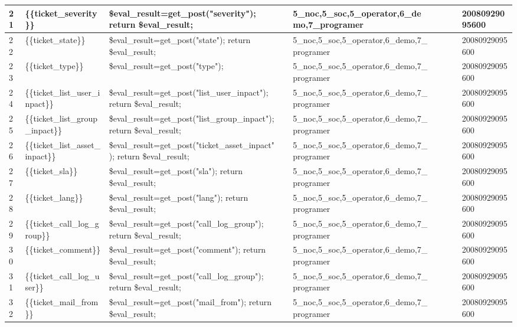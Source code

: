 \begin{longtable}{|l|l|l|l|l|l|l|l|l|}
21 & \{\{ticket\_severity\}\} & \$eval\_result=get\_post("severity");
return \$eval\_result; &  & 5\_noc,5\_soc,5\_operator,6\_demo,7\_programer &  &  &  & 20080929095600 \\ \hline 
22 & \{\{ticket\_state\}\} & \$eval\_result=get\_post("state");
return \$eval\_result; &  & 5\_noc,5\_soc,5\_operator,6\_demo,7\_programer &  &  &  & 20080929095600 \\ \hline 
23 & \{\{ticket\_type\}\} & \$eval\_result=get\_post("type"); &  & 5\_noc,5\_soc,5\_operator,6\_demo,7\_programer &  &  &  & 20080929095600 \\ \hline 
24 & \{\{ticket\_list\_user\_inpact\}\} & \$eval\_result=get\_post("list\_user\_inpact");
return \$eval\_result; &  & 5\_noc,5\_soc,5\_operator,6\_demo,7\_programer &  &  &  & 20080929095600 \\ \hline 
25 & \{\{ticket\_list\_group\_inpact\}\} & \$eval\_result=get\_post("list\_group\_inpact");
return \$eval\_result; &  & 5\_noc,5\_soc,5\_operator,6\_demo,7\_programer &  &  &  & 20080929095600 \\ \hline 
26 & \{\{ticket\_list\_asset\_inpact\}\} & \$eval\_result=get\_post("ticket\_asset\_inpact");
return \$eval\_result; &  & 5\_noc,5\_soc,5\_operator,6\_demo,7\_programer &  &  &  & 20080929095600 \\ \hline 
27 & \{\{ticket\_sla\}\} & \$eval\_result=get\_post("sla");
return \$eval\_result; &  & 5\_noc,5\_soc,5\_operator,6\_demo,7\_programer &  &  &  & 20080929095600 \\ \hline 
28 & \{\{ticket\_lang\}\} & \$eval\_result=get\_post("lang");
return \$eval\_result; &  & 5\_noc,5\_soc,5\_operator,6\_demo,7\_programer &  &  &  & 20080929095600 \\ \hline 
29 & \{\{ticket\_call\_log\_group\}\} & \$eval\_result=get\_post("call\_log\_group");
return \$eval\_result; &  & 5\_noc,5\_soc,5\_operator,6\_demo,7\_programer &  &  &  & 20080929095600 \\ \hline 
30 & \{\{ticket\_comment\}\} & \$eval\_result=get\_post("comment");
return \$eval\_result; &  & 5\_noc,5\_soc,5\_operator,6\_demo,7\_programer &  &  &  & 20080929095600 \\ \hline 
31 & \{\{ticket\_call\_log\_user\}\} & \$eval\_result=get\_post("call\_log\_group");
return \$eval\_result; &  & 5\_noc,5\_soc,5\_operator,6\_demo,7\_programer &  &  &  & 20080929095600 \\ \hline 
32 & \{\{ticket\_mail\_from\}\} & \$eval\_result=get\_post("mail\_from");
return \$eval\_result; &  & 5\_noc,5\_soc,5\_operator,6\_demo,7\_programer &  &  &  & 20080929095600 \\ \hline 

\end{longtable}
